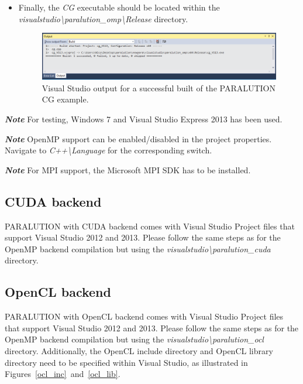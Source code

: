 \begin{itemize}
  \item Finally, the \emph{CG} executable should be located within the \emph{visualstudio\textbackslash paralution\_omp\textbackslash Release} directory.  
  \begin{figure}[!ht]
  \centering
  \includegraphics[width=1.0\textwidth]{./fig/visualstudio/vs_5.pdf}
  \caption{Visual Studio output for a successful built of the PARALUTION CG example.}
  \label{vs5}
  \end{figure}

\end{itemize}

\textbf{\emph{Note}} For testing, Windows 7 and Visual Studio Express 2013 has been used.

\textbf{\emph{Note}} OpenMP support can be enabled/disabled in the project properties. Navigate to \emph{C++\textbackslash Language} for the corresponding switch.

\textbf{\emph{Note}} For MPI support, the Microsoft MPI SDK has to be installed.


\subsection{CUDA backend}

PARALUTION with CUDA backend comes with Visual Studio Project files that support Visual Studio 2012 and 2013. Please follow the same steps as for the OpenMP backend compilation but using the \emph{visualstudio\textbackslash paralution\_cuda} directory.

\subsection{OpenCL backend}

PARALUTION with OpenCL backend comes with Visual Studio Project files that support Visual Studio 2012 and 2013. Please follow the same steps as for the OpenMP backend compilation but using the \emph{visualstudio\textbackslash paralution\_ocl} directory. Additionally, the OpenCL include directory and OpenCL library directory need to be specified within Visual Studio, as illustrated in Figures~\ref{ocl_inc}~and~\ref{ocl_lib}.

